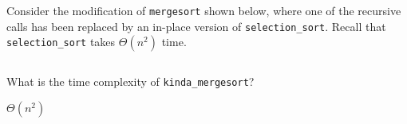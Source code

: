\begin{prob}
    Consider the modification of \texttt{mergesort} shown below, where one of the
    recursive calls has been replaced by an in-place version of
    \texttt{selection_sort}. Recall that \texttt{selection_sort} takes $\Theta(n^2)$
    time.

    \inputminted{python}{./code.py}

    What is the time complexity of \texttt{kinda_mergesort}?

    \begin{soln}
        $\Theta(n^2)$
    \end{soln}
\end{prob}
